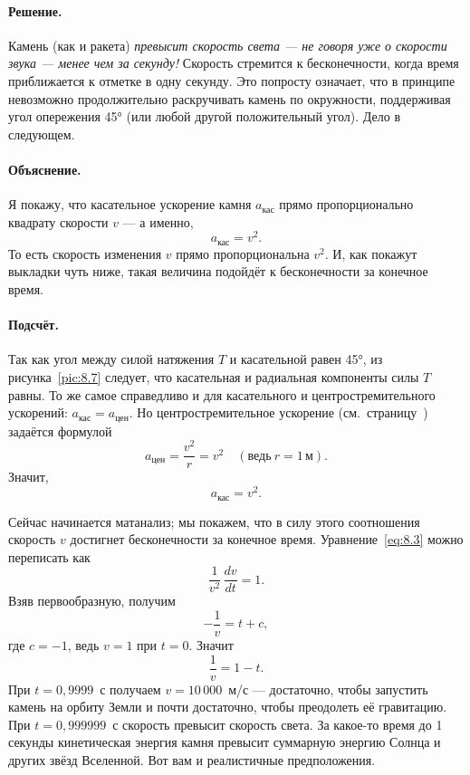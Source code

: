 \paragraph{Решение.}
Камень (как и ракета) \emph{превысит скорость света --- не говоря уже о скорости звука --- менее чем за секунду!}
Скорость стремится к бесконечности, когда время приближается к отметке в одну секунду.
Это попросту означает, что в принципе невозможно продолжительно раскручивать камень по окружности, поддерживая угол опережения 45° (или любой другой положительный угол).
Дело в следующем.

\paragraph{Объяснение.}
Я покажу, что касательное ускорение камня $a_{\text{кас}}$ прямо пропорционально квадрату скорости $v$ ---
а именно,
\[
a_{\text{кас}}=v^{2}.
\]
То есть скорость изменения $v$ прямо пропорциональна $v^2$.
И, как покажут выкладки чуть ниже, такая величина подойдёт к бесконечности за конечное время.

\paragraph{Подсчёт.}
Так как угол между силой натяжения $T$ и касательной равен 45°,
из рисунка~\ref{pic:8.7} следует, что касательная и радиальная компоненты силы $T$ равны.
То же самое справедливо и для касательного и центростремительного ускорений:
$a_{\text{кас}}=a_{\text{цен}}$.
Но центростремительное ускорение (см.~страницу~\pageref{sec:A.9}) задаётся формулой
\[
a_{\text{цен}}=\frac{v^2}{r}=v^2 \quad (\text{ведь}\  r=1\,\text{м}).
\]
Значит,
\begin{equation}
a_{\text{кас}}=v^2. \label{eq:8.3}
\end{equation}

Сейчас начинается матанализ; мы покажем, что в силу этого соотношения скорость $v$ достигнет бесконечности за конечное время.
Уравнение~\eqref{eq:8.3} можно переписать как
\begin{equation}
\frac{1}{v^2}\,\frac{dv}{dt}=1. \label{eq:8.4}
\end{equation}
Взяв первообразную, получим
\[
-\frac{1}{v}=t+c,
\]
где $c=-1$, ведь $v=1$ при $t=0$.
Значит
\[
\frac{1}{v}=1-t.
\]
При $t=0{,}9999$~с получаем $v=10\,000$~м/с ---
достаточно, чтобы запустить камень на орбиту Земли и почти достаточно,
чтобы преодолеть её гравитацию.
При $t=0{,}999999$~с скорость превысит скорость света.
За какое-то время до 1 секунды кинетическая энергия камня
превысит суммарную энергию Солнца и других
звёзд Вселенной.
Вот вам и реалистичные предположения.

